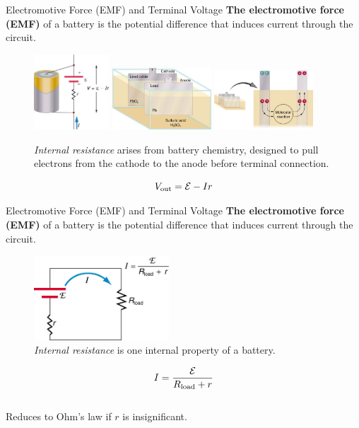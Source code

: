 \documentclass{beamer}
\begin{document}
\begin{frame}{Electromotive Force (EMF) and Terminal Voltage}
\small
\textbf{\alert{The electromotive force (EMF)}} of a battery is the potential difference that induces current through the circuit.
\begin{figure}
\includegraphics[width=0.25\textwidth]{figures/internal_r.png} \hspace{0.25cm}
\includegraphics[width=0.33\textwidth]{figures/internal_batt_1.png}
\includegraphics[width=0.33\textwidth]{figures/internal_batt_2.png}
\caption{\label{fig:internal_r2} \textit{Internal resistance} arises from battery chemistry, designed to pull electrons from the cathode to the anode before terminal connection.}
\end{figure}
\begin{equation}
V_{\rm out} = \mathcal{E} - I r
\end{equation}
\end{frame}

\begin{frame}{Electromotive Force (EMF) and Terminal Voltage}
\small
\textbf{\alert{The electromotive force (EMF)}} of a battery is the potential difference that induces current through the circuit.
\begin{figure}
\includegraphics[width=0.45\textwidth]{figures/internal_batt_3.png}
\caption{\label{fig:internal_r3} \textit{Internal resistance} is one internal property of a battery.}
\end{figure}
\begin{equation}
I = \frac{\mathcal{E}}{R_{\rm load} + r}
\end{equation} \\ \vspace{0.5cm}
Reduces to Ohm's law if $r$ is insignificant.
\end{frame}
\end{document}
